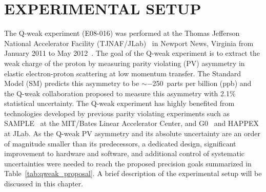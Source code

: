 \chapter{EXPERIMENTAL SETUP}
\label{EXPERIMENTAL SETUP}

The Q-weak experiment (E08-016) was performed at the Thomas Jefferson National Accelerator Facility (TJNAF/JLab)~\cite{website:jlab} in Newport News, Virginia from January 2011 to May 2012~\cite{qweak_proposal_2001, qweak_proposal_2004, qweak_proposal_2007}. 
The goal of the Q-weak experiment is to extract the weak charge of the proton by measuring parity violating (PV) asymmetry in elastic electron-proton scattering at low momentum transfer. The Standard Model (SM) predicts this asymmetry to be $\sim-$250~parts per billion (ppb) and the Q-weak collaboration proposed to measure this asymmetry with 2.1\% statistical uncertainty. The Q-weak experiment has highly benefited from technologies developed by previous parity violating experiments such as SAMPLE~\cite{Beise2005289} at the MIT/Bates Linear Accelerator Center, and G0~\cite{PhysRevLett.95.092001} and HAPPEX~\cite{PhysRevLett.96.022003} at JLab. As the Q-weak PV asymmetry and its absolute uncertainty are an order of magnitude smaller than its predecessors, a dedicated design, significant improvement to hardware and software, and additional control of systematic uncertainties were needed to reach the proposed precision goals summarized in Table~\ref{tab:qweak_proposal}. A brief description of the experimental setup will be discussed in this chapter.

